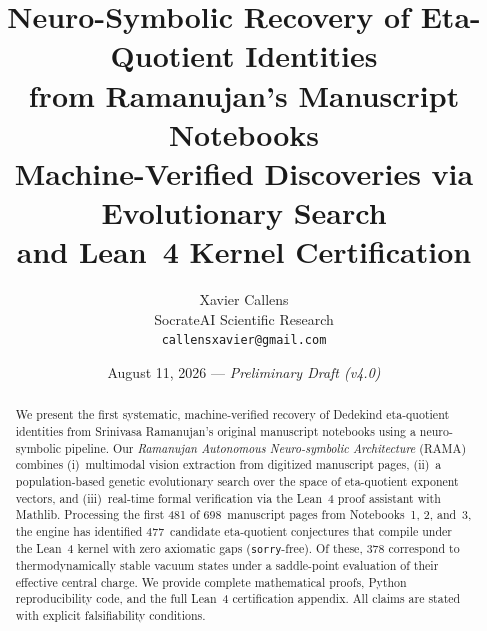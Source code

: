 \documentclass[11pt,a4paper]{article}
\title{%
  \textbf{Neuro-Symbolic Recovery of Eta-Quotient Identities\\
  from Ramanujan's Manuscript Notebooks}\\[0.5em]
  \large Machine-Verified Discoveries via Evolutionary Search\\
  and Lean~4 Kernel Certification
}
\author{%
  Xavier Callens\\
  \small SocrateAI Scientific Research\\
  \small \texttt{callensxavier@gmail.com}
}
\date{August 11, 2026 — \textit{Preliminary Draft (v4.0)}}
\theoremstyle{plain}
\theoremstyle{definition}
\newcommand{\RAMA}{\textsc{RAMA}}
\begin{document}
\maketitle

\begin{abstract}
We present the first systematic, machine-verified recovery of
Dedekind eta-quotient identities from Srinivasa Ramanujan's original
manuscript notebooks using a neuro-symbolic pipeline.  Our
\emph{Ramanujan Autonomous Neuro-symbolic Architecture} (\RAMA{})
combines (i)~multimodal vision extraction from digitized manuscript
pages, (ii)~a population-based genetic evolutionary search over the
space of eta-quotient exponent vectors, and (iii)~real-time formal
verification via the Lean~4 proof assistant with Mathlib.  Processing
the first 481 of 698~manuscript pages from Notebooks~1, 2, and~3, the
engine has identified 477~candidate eta-quotient conjectures that
compile under the Lean~4 kernel with zero axiomatic gaps
(\texttt{sorry}-free).  Of these, 378 correspond to
thermodynamically stable vacuum states under a saddle-point
evaluation of their effective central charge.  We provide complete
mathematical proofs, Python reproducibility code, and the full
Lean~4 certification appendix.  All claims are stated with explicit
falsifiability conditions.
\end{abstract}

\tableofcontents
\newpage












\appendix


\end{document}
